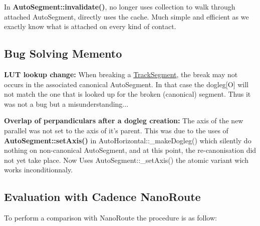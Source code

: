 \begin{DoxyItemize}
\item In {\bf Auto\-Segment\-::invalidate()}, no longer uses collection to walk through attached Auto\-Segment, directly uses the cache. Much simple and efficient as we exactly know what is attached on every kind of contact.
\end{DoxyItemize}\hypertarget{pageNotes_ssecBugBusting}{}\subsection{Bug Solving Memento}\label{pageNotes_ssecBugBusting}
{\bfseries L\-U\-T lookup change\-:} When breaking a \hyperlink{classKite_1_1TrackSegment}{Track\-Segment}, the break may not occurs in the associated canonical Auto\-Segment. In that case the {\ttfamily dogleg\mbox{[}O\mbox{]}} will not match the one that is looked up for the broken (canonical) segment. Thus it was not a bug but a misunderstanding...

{\bfseries Overlap of perpandiculars after a dogleg creation\-:} The axis of the new parallel was not set to the axis of it's parent. This was due to the uses of {\bf Auto\-Segment\-::set\-Axis()} in Auto\-Horizontal\-::\-\_\-make\-Dogleg() which silently do nothing on non-\/canonical Auto\-Segment, and at this point, the re-\/canonisation did not yet take place. Now Uses Auto\-Segment\-::\-\_\-set\-Axis() the atomic variant wich works inconditionnaly.\hypertarget{pageNotes_ssecNanoRoute}{}\subsection{Evaluation with Cadence Nano\-Route}\label{pageNotes_ssecNanoRoute}
To perform a comparison with Nano\-Route the procedure is as follow\-:


